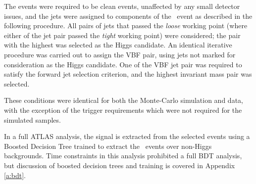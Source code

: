 		The events were required to be clean events, unaffected by any small detector issues, and the jets were assigned to components of the \VBFHBB\, event as described in the following procedure. All pairs of jets that passed the \textit{loose} working point (where either of the jet pair passed the \textit{tight} working point) were considered; the pair with the highest \ptbb was selected as the Higgs candidate. An identical iterative procedure was carried out to assign the VBF pair, using jets not marked for consideration as the Higgs candidate. One of the VBF jet pair was required to satisfy the forward jet selection criterion, and the highest invariant mass pair was selected.

		These conditions were identical for both the Monte-Carlo simulation and data, with the exception of the trigger requirements which were not required for the simulated samples.

		In a full ATLAS analysis\cite{VBFHbb8tev}, the signal is extracted from the selected events using a Boosted Decision Tree trained to extract the \VBFHBB\, events over non-Higgs backgrounds. Time constraints in this analysis prohibited a full BDT analysis, but discussion of boosted decision trees and training is covered in Appendix \ref{a:bdt}.


\endinput

